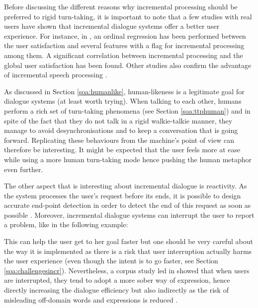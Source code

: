                 Before discussing the different reasons why incremental processing should be preferred to rigid turn-taking, it is important to note that a few studies with real users have shown that incremental dialogue systems offer a better user experience. For instance, in \cite{Aist2007}, an ordinal regression has been performed between the user satisfaction and several features with a flag for incremental processing among them. A significant correlation between incremental processing and the global user satisfaction has been found. Other studies also confirm the advantage of incremental speech processing \cite{Skantze2009,El-Asri2014a,Zhao2015}.

                As discussed in Section \ref{soa:humanlike}, human-likeness is a legitimate goal for dialogue systems (at least worth trying). When talking to each other, humans perform a rich set of turn-taking phenomena (see Section \ref{soa:ttphuman}) and in spite of the fact that they do not talk in a rigid walkie-talkie manner, they manage to avoid desynchronisations and to keep a conversation that is going forward. Replicating these behaviours from the machine's point of view can therefore be interesting. It might be expected that the user feels more at ease while using a more human turn-taking mode hence pushing the human metaphor even further.

                The other aspect that is interesting about incremental dialogue is reactivity. As the system processes the user's request before its ends, it is possible to design accurate end-point detection in order to detect the end of this request as soon as possible \cite{Raux2008}. Moreover, incremental dialogue systems can interrupt the user to report a problem, like in the following example:
                
                \begin{dialogue}
                  \end{dialogue}
                  
                  This can help the user get to her goal faster but one should be very careful about the way it is implemented as there is a risk that user interruption actually harms the user experience (even though the intent is to go faster, see Section \ref{soa:challengesincr}). Nevertheless, a corpus study led in \cite{Ghigi2014} showed that when users are interrupted, they tend to adopt a more sober way of expression, hence directly increasing the dialogue efficiency but also indirectly as the risk of misleading off-domain words and expressions is reduced \cite{Zhao2015}.
                  
